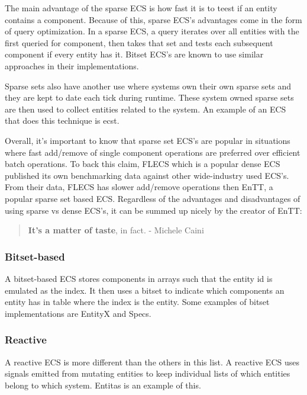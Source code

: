 The main advantage of the sparse ECS is how fast it is to teest if an entity contains a component. Because of this, sparse ECS's advantages come in the form of query optimization. In a sparse ECS, a query iterates over all entities with the first queried for component, then takes that set and tests each subsequent component if every entity has it. Bitset ECS's are known to use similar approaches in their implementations.

Sparse sets also have another use where systems own their own sparse sets and they are kept to date each tick during runtime. These system owned sparse sets are then used to collect entities related to the system. An example of an ECS that does this technique is ecst. 

Overall, it's important to know that sparse set ECS's are popular in situations where fast add/remove of single component operations are preferred over efficient batch operations. To back this claim, FLECS which is a popular dense ECS published its own benchmarking data against other wide-industry used ECS's. From their data, FLECS has slower add/remove operations then EnTT, a popular sparse set based ECS. Regardless of the advantages and disadvantages of using sparse vs dense ECS's, it can be summed up nicely by the creator of EnTT:

\begin{quote}
    \textbf{It’s a matter of taste}, in fact.
        - Michele Caini
\end{quote}

\subsubsection{Bitset-based}
A bitset-based ECS stores components in arrays such that the entity id is emulated as the index. It then uses a bitset to indicate which components an entity has in table where the index is the entity. Some examples of bitset implementations are EntityX and Specs.

\subsubsection{Reactive}
A reactive ECS is more different than the others in this list. A reactive ECS uses signals emitted from mutating entities to keep individual lists of which entities belong to which system. Entitas is an example of this. 

